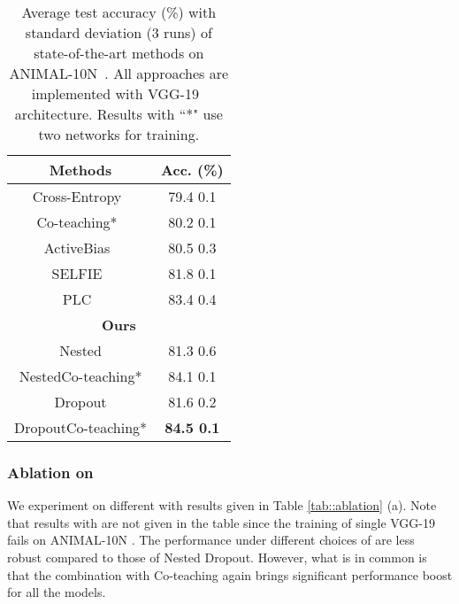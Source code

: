 \documentclass[journal]{IEEEtran}
\begin{document}
\begin{table}[t]
    \caption{Average test accuracy (\%) with standard deviation (3 runs) of state-of-the-art methods on ANIMAL-10N~\cite{song2019selfie}. All approaches are implemented with VGG-19~\cite{simonyan2014very} architecture.
    Results with ``*" use two networks for training.}
    \vspace{-2mm}
    \label{tab::animal}
    \begin{center}
    \begin{tabular}{c|c}
        \hline\hline
        Methods  & Acc. (\%)   
        \\ \hline
        Cross-Entropy~\cite{song2019selfie} & 79.4 {} 0.1
        \\
        Co-teaching*~\cite{han2018co,song2019selfie} & 80.2 {} 0.1
        \\
        ActiveBias~\cite{chang2017active,song2019selfie} & 80.5  0.3
        \\
        SELFIE~\cite{song2019selfie} & 81.8 {} 0.1
        \\
        PLC~\cite{zhang2021learning} & 83.4 {} 0.4
        \\ \hline
        \multicolumn{2}{c}{\bf Ours} 
        \\
        Nested & 81.3 {} 0.6
        \\
        NestedCo-teaching* & 84.1 {} 0.1
        \\
        Dropout & 81.6 {} 0.2
        \\
        DropoutCo-teaching* & \bf 84.5 {} 0.1
        \\ \hline\hline
    \end{tabular}
    \end{center}
    \vspace{-5mm}
\end{table}


\subsubsection{Ablation on }
We experiment on different  with results given in Table \ref{tab::ablation} (a).
Note that results with  are not given in the table since the training of single VGG-19 fails on ANIMAL-10N \cite{song2019selfie}.
The performance under different choices of  are less robust compared to those of Nested Dropout.
However, what is in common is that the combination with Co-teaching again brings significant performance boost for all the models.
\end{document}

